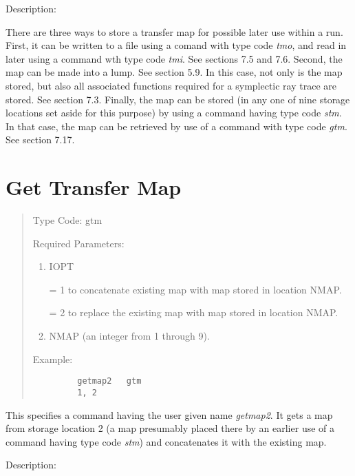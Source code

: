 \vspace{5mm}
     Description:
\vspace{2mm}

There are three ways to store a transfer map for possible later use
within a \Mary run.  First, it can be written to a file using a comand
with type code {\em tmo}, and read in later using a command wth type code
{\em tmi}.  See sections 7.5 and 7.6.  Second, the map can be made into a
lump.  See section 5.9.  In this case, not only is the map stored, but
also all associated functions required for a symplectic ray trace are
stored.  See section 7.3.  Finally, the map can be stored (in any one of
nine storage locations set aside for this purpose) by using a command
having type code {\em stm}.  In that case, the map can be retrieved by
use of a command with type code {\em gtm}.  See section 7.17.

\newpage
\section{Get Transfer Map}
\begin{quotation}
\noindent     Type Code:  gtm
\vspace{5mm}

\noindent Required Parameters:
\begin{enumerate}
      \item  IOPT

             = 1 to concatenate existing map with map stored in location NMAP.

             = 2 to replace the existing map with map stored in location NMAP.

      \item  NMAP (an integer from 1 through 9).
\end{enumerate}

\vspace{5mm}
\noindent     Example:
\begin{verbatim}
         getmap2   gtm
         1, 2
\end{verbatim}
\end{quotation}
This specifies a command having the user given name {\em getmap2}.  It
gets a map from storage location 2 (a map presumably placed there by an earlier
use of a command having type code {\em stm}) and concatenates it with the
existing map.

\vspace{5mm}
     Description:
\vspace{2mm}

